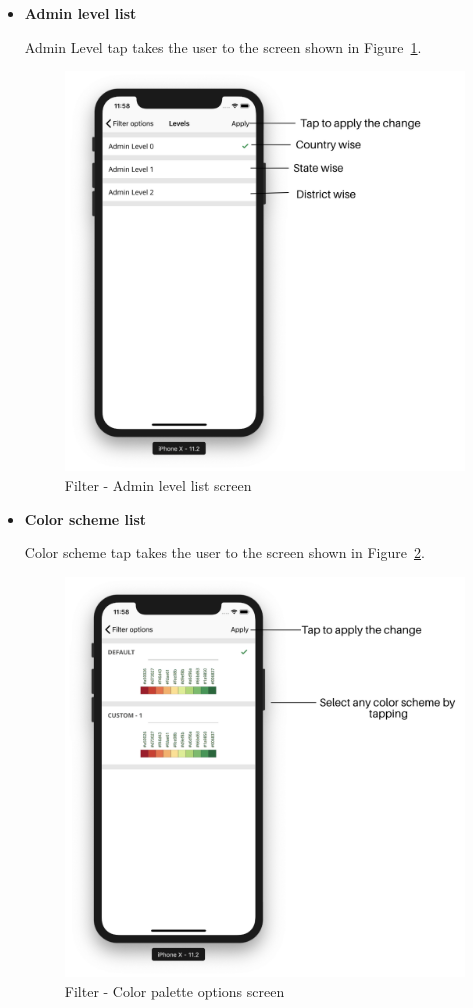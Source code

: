 \begin{itemize}
\begin{itemize}
        \item \textbf{Admin level list}
        
        Admin Level tap takes the user to the screen shown in Figure~\ref{fig:level_list_screen}.
        
         \begin{figure}[H]
            \centering
            \includegraphics[width=0.50\linewidth]{figures/ch2/level_list.png}
            \caption{\label{fig:level_list_screen} Filter - Admin level list screen}
        \end{figure}

     \item \textbf{Color scheme list}
     
     Color scheme tap takes the user to the screen shown in Figure~\ref{fig:color_scheme}.
        
        \begin{figure}[H]
            \centering
            \includegraphics[width=0.50\linewidth]{figures/ch2/color_scheme.png}
            \caption{\label{fig:color_scheme} Filter - Color palette  options screen}
        \end{figure}
        
    \end{itemize}

\end{itemize}



